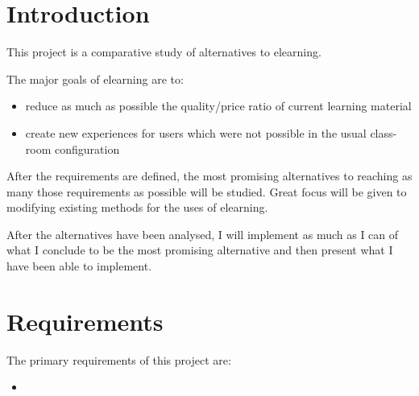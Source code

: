 \documentclass[12pt]{article}
\begin{document}
\section{Introduction}

This project is a comparative study of alternatives to elearning.

The major goals of elearning are to:

\begin{itemize}
  \item reduce as much as possible the quality/price ratio of current learning material
  \item create new experiences for users which were not possible in the usual class-room configuration
\end{itemize}

After the requirements are defined, the most promising alternatives to reaching as many those requirements as possible will be studied. Great focus will be given to modifying existing methods for the uses of elearning.

After the alternatives have been analysed, I will implement as much as I can of what I conclude to be the most promising alternative and then present what I have been able to implement.

\section{Requirements}

The primary requirements of this project are:

\begin{itemize}
  \item 
\end{itemize}
\end{document}
